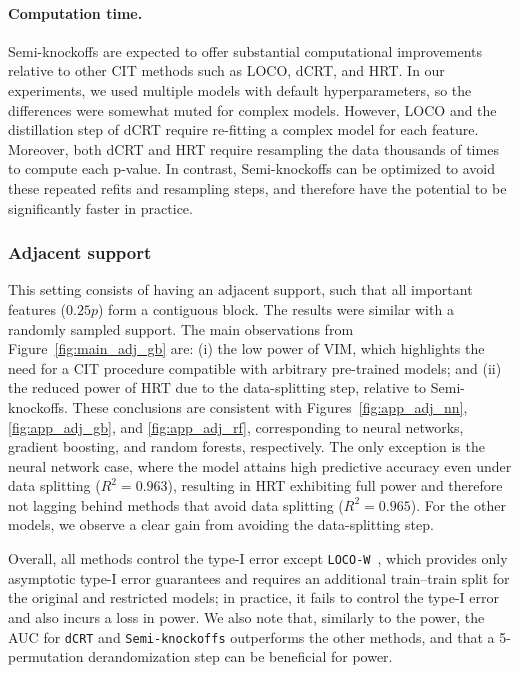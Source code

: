 \documentclass{article}
\theoremstyle{plain}
\theoremstyle{definition}
\theoremstyle{remark}
\begin{document}
\paragraph{Computation time.}
Semi-knockoffs are expected to offer substantial computational improvements relative to other CIT methods such as LOCO, dCRT, and HRT. In our experiments, we used multiple models with default hyperparameters, so the differences were somewhat muted for complex models. However, LOCO and the distillation step of dCRT require re-fitting a complex model for each feature. Moreover, both dCRT and HRT require resampling the data thousands of times to compute each p-value. In contrast, Semi-knockoffs can be optimized to avoid these repeated refits and resampling steps, and therefore have the potential to be significantly faster in practice.

 

\subsubsection{Adjacent support}


This setting consists of having an adjacent support, such that all important features ($0.25p$) form a contiguous block. The results were similar with a randomly sampled support. The main observations from Figure~\ref{fig:main_adj_gb} are: (i) the low power of VIM, which highlights the need for a CIT procedure compatible with arbitrary pre-trained models; and (ii) the reduced power of HRT due to the data-splitting step, relative to Semi-knockoffs. These conclusions are consistent with Figures~\ref{fig:app_adj_nn}, \ref{fig:app_adj_gb}, and \ref{fig:app_adj_rf}, corresponding to neural networks, gradient boosting, and random forests, respectively. The only exception is the neural network case, where the model attains high predictive accuracy even under data splitting ($R^2 = 0.963$), resulting in HRT exhibiting full power and therefore not lagging behind methods that avoid data splitting ($R^2 = 0.965$). For the other models, we observe a clear gain from avoiding the data-splitting step.

Overall, all methods control the type-I error except \texttt{LOCO-W}~\cite{williamson2023general}, which provides only asymptotic type-I error guarantees and requires an additional train–train split for the original and restricted models; in practice, it fails to control the type-I error and also incurs a loss in power. We also note that, similarly to the power, the AUC for \texttt{dCRT} and \texttt{Semi-knockoffs} outperforms the other methods, and that a 5-permutation derandomization step can be beneficial for power.
\end{document}
